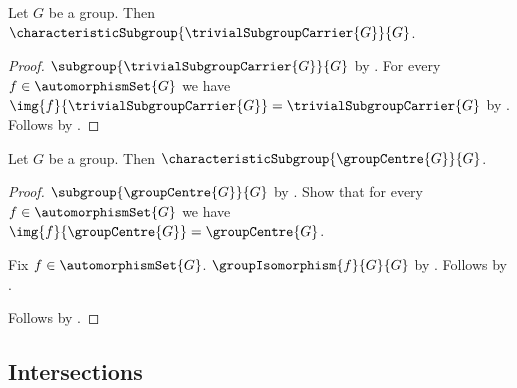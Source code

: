 \begin{proposition}\label{trivial_carrier_characteristic_subgroup}
    Let $G$ be a group.
    Then $\characteristicSubgroup{\trivialSubgroupCarrier{G}}{G}$.
\end{proposition}
\begin{proof}
    $\subgroup{\trivialSubgroupCarrier{G}}{G}$ by
        .
    For every $f\in\automorphismSet{G}$ we have
        $\img{f}{\trivialSubgroupCarrier{G}}=
            \trivialSubgroupCarrier{G}$ by
        .
    Follows by .
\end{proof}

\begin{theorem}\label{group_centre_characteristic_subgroup}
    Let $G$ be a group.
    Then $\characteristicSubgroup{\groupCentre{G}}{G}$.
\end{theorem}
\begin{proof}
    $\subgroup{\groupCentre{G}}{G}$ by
        .
    Show that for every $f\in\automorphismSet{G}$ we have
        $\img{f}{\groupCentre{G}}=\groupCentre{G}$.
    \begin{subproof}
        Fix $f\in\automorphismSet{G}$.
        $\groupIsomorphism{f}{G}{G}$ by
            .
        Follows by .
    \end{subproof}
    Follows by .
\end{proof}

\subsection{Intersections}

